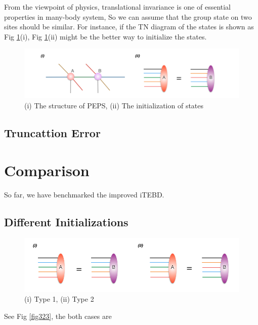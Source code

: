 From the viewpoint of physics, translational invariance is one of essential properties in many-body system, So we can assume that the group state on two sites should be similar. For instance, if the TN diagram of the states is shown as Fig \ref{fig321}(i), Fig \ref{fig321}(ii) might be the better way to initialize the states.

\begin{figure}[ht]
	\centering
	\includegraphics[width=1.00\textwidth]{figures/fig321.png}
	\caption[The diagrams of initializing projected entangled pair states]{(i) The structure of PEPS, (ii) The initialization of states}
	\label{fig321}
\end{figure}

\subsection{Truncattion Error}

\section{Comparison}

So far, we have benchmarked the improved iTEBD. 

\label{Comparison}
\subsection{Different Initializations}

\begin{figure}[ht]
	\centering
	\includegraphics[width=1.00\textwidth]{figures/fig322.png}
	\caption[Different methods to initialize the states]{(i) Type 1, (ii) Type 2}
	\label{fig322}
\end{figure}

See Fig \ref{fig323}, the both cases are 

